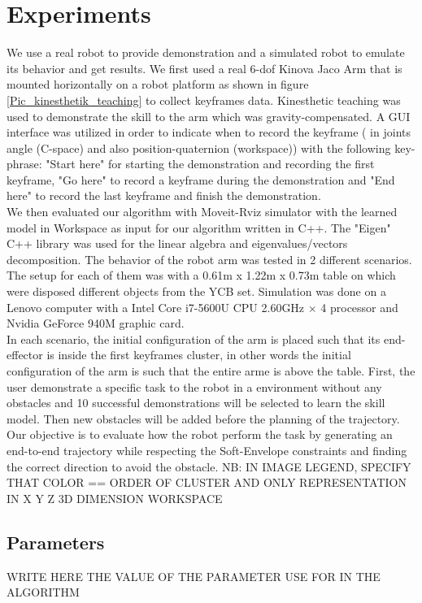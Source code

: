 \documentclass[letterpaper, 10 pt, conference]{ieeeconf}  %
\begin{document}
\section{Experiments}
We use a real robot to provide demonstration and a simulated robot to emulate its behavior and get results.
We first used a real 6-dof Kinova Jaco Arm that is mounted horizontally on a robot platform as shown in figure \ref{Pic_kinesthetik_teaching} to collect keyframes data. Kinesthetic teaching was used to demonstrate the skill to the arm which was gravity-compensated. A GUI interface was utilized in order to indicate when to record the keyframe ( in joints angle (C-space) and also position-quaternion (workspace)) with the following key-phrase: "Start here" for starting the demonstration and recording the first keyframe, "Go here" to record a keyframe during the demonstration and "End here" to record the last keyframe and finish the demonstration. \\
We then evaluated our algorithm with Moveit-Rviz simulator with the learned model in Workspace as input for our algorithm written in C++. The "Eigen" C++ library was used for the linear algebra and eigenvalues/vectors decomposition. The behavior of the robot arm was tested in 2 different scenarios. The setup for each of them was with a 0.61m x 1.22m x 0.73m table on which were disposed different objects from the YCB set. Simulation was done on a Lenovo computer with  a Intel Core i7-5600U CPU 2.60GHz × 4 processor and Nvidia GeForce 940M graphic card.\\
In each scenario, the initial configuration of the arm is placed such that its end-effector is inside the first keyframes cluster, in other words the initial configuration of the arm is such that the entire arme is above the table. First, the user demonstrate a specific task to the robot in a environment without any obstacles and 10 successful demonstrations will be selected to learn the skill model. Then new obstacles will be added before the planning of the trajectory. Our objective is to evaluate how the robot perform the task by generating an end-to-end trajectory while respecting the Soft-Envelope constraints and finding the correct direction to avoid the obstacle.
NB: IN IMAGE LEGEND, SPECIFY THAT COLOR == ORDER OF CLUSTER AND ONLY REPRESENTATION IN X Y Z 3D DIMENSION WORKSPACE

\subsection{Parameters}
WRITE HERE THE VALUE OF THE PARAMETER USE FOR IN THE ALGORITHM
\end{document}
